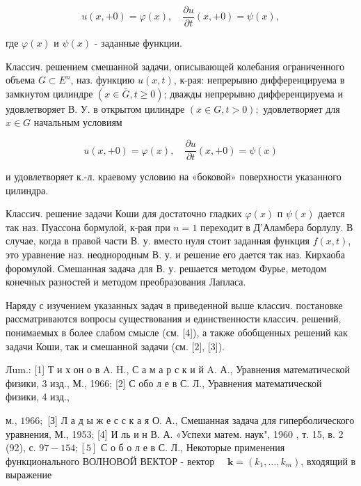 \documentclass[10pt]{article}
\begin{document}
\[

u(x,+0)=\varphi(x), \quad \frac{\partial u}{\partial t}(x,+0)=\psi(x),

\]



где $\varphi(x)$ и $\psi(x)$ - заданные функции.



Классич. решением смешанной задачи, описывающей колебания ограниченного объема $G \subset E^{n}$, наз. функцию $u(x, t)$, к-рая: непрерывно дифференцируема в замкнутом цилиндре $(x \in \bar{G}, t \geqslant 0)$; дважды непрерывно дифференцируема и удовлетворяет В. У. в открытом цилиндре $(x \in G, t>0) ;$ удовлетворяет для $x \in G$ начальным условиям



\[

u(x,+0)=\varphi(x), \quad \frac{\partial u}{\partial t}(x,+0)=\psi(x)

\]



и удовлетворяет к.-л. краевому условию на «боковой» поверхности указанного цилиндра.



Классич. решение задачи Коши для достаточно гладких $\varphi(x)$ п $\psi(x)$ дается так наз. Пуассона бормулой, к-рая при $n=1$ переходит в Д'Аламбера борлулу. В случае, когда в правой части В. у. вместо нуля стоит заданная функция $f(x, t)$, это уравнение наз. неоднородным В. у. и решение его дается так наз. Кирхаоба форомулой. Смешанная задача для В. у. решается методом Фурье, методом конечных разностей и методом преобразования Лапласа.



Наряду с изучением указанных задач в приведенной выше классич. постановке рассматриваются вопросы существования и единственности классич. решений, понимаемых в более слабом смысле (см. [4]), а также обобщенных решений как задачи Коши, так и смешанной задачи (см. [2], [3]).



Лum.: [1] Т и х он о в A. H., С а м а р с к и й A. А., Уравнения математической физики, 3 изд., М., 1966; [2] С обо л е в С. Л., Уравнения математической физики, 4 изд.,

м., $1966 ;$ [З] Л а д ы ж е с с к а я О. А., Смешанная задача для гиперболического уравнения, М., 1953; [4] И ль и н В. А. «Успехи матем. наук", 1960 , т. 15, в. 2 (92), с. $97-154 ;[5]$ С о б о л е в С. Л., Некоторые применения функционального ВОЛНОВОЙ ВЕКТОР - вектор $\quad \boldsymbol{k}=\left(k_{1}, \ldots, k_{m}\right)$, входящий в выражение
\end{document}
